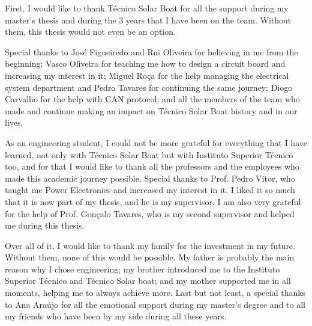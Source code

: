 \documentclass[defaultstyle,10pt,Helvetica]{istulthesis}
\begin{document}
\begin{acknowledgments}
	First, I would like to thank Técnico Solar Boat for all the support during my master's thesis and during the 3 years that I have been on the team. Without them, this thesis would not even be an option. 
	
	Special thanks to José Figueiredo and Rui Oliveira for believing in me from the beginning; Vasco Oliveira for teaching me how to design a circuit board and increasing my interest in it; Miguel Roça for the help managing the electrical system department and Pedro Tavares for continuing the same journey; Diogo Carvalho for the help with CAN protocol; and all the members of the team who made and continue making an impact on Técnico Solar Boat history and in our lives.

	As an engineering student, I could not be more grateful for everything that I have learned, not only with Técnico Solar Boat but with Instituto Superior Técnico too, and for that I would like to thank all the professors and the employees who made this academic journey possible. Special thanks to Prof. Pedro Vitor, who taught me Power Electronics and increased my interest in it. I liked it so much that it is now part of my thesis, and he is my supervisor. I am also very grateful for the help of Prof. Gonçalo Tavares, who is my second supervisor and helped me during this thesis.

	Over all of it, I would like to thank my family for the investment in my future. Without them, none of this would be possible. My father is probably the main reason why I chose engineering; my brother introduced me to the Instituto Superior Técnico and Técnico Solar boat; and my mother supported me in all moments, helping me to always achieve more. Last but not least, a special thanks to Ana Araújo for all the emotional support during my master's degree and to all my friends who have been by my side during all these years.

\end{acknowledgments}

\setcounter{page}{1} 
\baselineskip 18pt %
\begin{abstract}
	
\end{abstract}
\begin{keywords}
  
\end{keywords}
\clearpage
\thispagestyle{empty}
\end{document}
